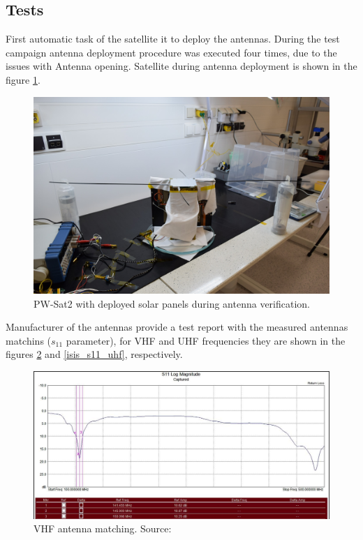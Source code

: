 \subsection{Tests}
First automatic task of the satellite it to deploy the antennas. During the test campaign antenna deployment procedure was executed four times, due to the issues with Antenna opening. Satellite during antenna deployment is shown in the figure \ref{pwsat_with_deployed_antennas}.

\begin{figure}
    \centering
    \includegraphics[width=0.8\paperwidth]{img/6/pwsat_with_deployed_antennas.JPG}
    \caption{PW-Sat2 with deployed solar panels during antenna verification.}
    \label{pwsat_with_deployed_antennas}
\end{figure}

Manufacturer of the antennas provide a test report with the measured antennas matchins ($s_{11}$ parameter), for VHF and UHF frequencies they are shown in the figures \ref{isis_s11_vhf} and  \ref{isis_s11_uhf}, respectively.

\begin{figure}[H]
    \centering
    \includegraphics[width=0.8\paperwidth]{img/6/isis_s11_vhf.png}
    \caption{VHF antenna matching. Source: \cite{isis_ant_test_report}}
    \label{isis_s11_vhf}
\end{figure}

